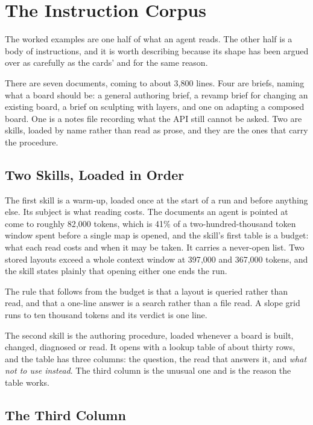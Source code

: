 \section{The Instruction Corpus}

The worked examples are one half of what an agent reads. The other half is a body
of instructions, and it is worth describing because its shape has been argued over
as carefully as the cards' and for the same reason.

There are seven documents, coming to about 3{,}800 lines. Four are briefs, naming
what a board should be: a general authoring brief, a revamp brief for changing an
existing board, a brief on sculpting with layers, and one on adapting a composed
board. One is a notes file recording what the API still cannot be asked. Two are
skills, loaded by name rather than read as prose, and they are the ones that carry
the procedure.

\subsection{Two Skills, Loaded in Order}

The first skill is a warm-up, loaded once at the start of a run and before
anything else. Its subject is what reading costs. The documents an agent is
pointed at come to roughly 82{,}000 tokens, which is 41\% of a two-hundred-thousand
token window spent before a single map is opened, and the skill's first table is a
budget: what each read costs and when it may be taken. It carries a never-open
list. Two stored layouts exceed a whole context window at 397{,}000 and 367{,}000
tokens, and the skill states plainly that opening either one ends the run.

The rule that follows from the budget is that a layout is queried rather than read,
and that a one-line answer is a search rather than a file read. A slope grid runs
to ten thousand tokens and its verdict is one line.

The second skill is the authoring procedure, loaded whenever a board is built,
changed, diagnosed or read. It opens with a lookup table of about thirty rows, and
the table has three columns: the question, the read that answers it, and
\emph{what not to use instead}. The third column is the unusual one and is the
reason the table works.

\subsection{The Third Column}

